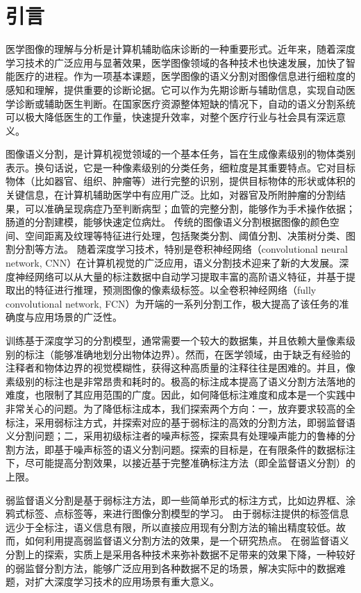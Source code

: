 \chapter{引言}

医学图像的理解与分析是计算机辅助临床诊断的一种重要形式。近年来，随着深度学习技术的广泛应用与显著效果，医学图像领域的各种技术也快速发展，加快了智能医疗的进程。作为一项基本课题，医学图像的语义分割对图像信息进行细粒度的感知和理解，提供重要的诊断论据。它可以作为先期诊断与辅助信息，实现自动医学诊断或辅助医生判断。在国家医疗资源整体短缺的情况下，自动的语义分割系统可以极大降低医生的工作量，快速提升效率，对整个医疗行业与社会具有深远意义。

图像语义分割，是计算机视觉领域的一个基本任务，旨在生成像素级别的物体类别表示。换句话说，它是一种像素级别的分类任务，细粒度是其重要特点。它对目标物体（比如器官、组织、肿瘤等）进行完整的识别，提供目标物体的形状或体积的关键信息，在计算机辅助医学中有应用广泛。比如，对器官及所附肿瘤的分割结果，可以准确呈现病症乃至判断病型；血管的完整分割，能够作为手术操作依据；肠道的分割建模，能够快速定位病灶。
传统的图像语义分割根据图像的颜色空间、空间距离及纹理等特征进行处理，包括聚类分割、阈值分割、决策树分类、图割分割等方法。
随着深度学习技术，特别是卷积神经网络（convolutional neural network, CNN）在计算机视觉的广泛应用，语义分割技术迎来了新的大发展。深度神经网络可以从大量的标注数据中自动学习提取丰富的高阶语义特征，并基于提取出的特征进行推理，预测图像的像素级标签。以全卷积神经网络（fully convolutional network, FCN）为开端的一系列分割工作，极大提高了该任务的准确度与应用场景的广泛性。

训练基于深度学习的分割模型，通常需要一个较大的数据集，并且依赖大量像素级别的标注（能够准确地划分出物体边界）。然而，在医学领域，由于缺乏有经验的注释者和物体边界的视觉模糊性，获得这种高质量的注释往往是困难的。并且，像素级别的标注也是非常昂贵和耗时的。极高的标注成本提高了语义分割方法落地的难度，也限制了其应用范围的广度。因此，如何降低标注难度和成本是一个实践中非常关心的问题。为了降低标注成本，我们探索两个方向：一，放弃要求较高的全标注，采用弱标注方式，并探索对应的基于弱标注的高效的分割方法，即弱监督语义分割问题；二，采用初级标注者的噪声标签，探索具有处理噪声能力的鲁棒的分割方法，即基于噪声标签的语义分割问题。探索的目标是，在有限条件的数据标注下，尽可能提高分割效果，以接近基于完整准确标注方法（即全监督语义分割）的上限。

弱监督语义分割是基于弱标注方法，即一些简单形式的标注方式，比如边界框、涂鸦式标签、点标签等，来进行图像分割模型的学习。
由于弱标注提供的标签信息远少于全标注，语义信息有限，所以直接应用现有分割方法的输出精度较低。故而，如何利用提高弱监督语义分割方法的效果，是一个研究热点。
在弱监督语义分割上的探索，实质上是采用各种技术来弥补数据不足带来的效果下降，一种较好的弱监督分割方法，能够广泛应用到各种数据不足的场景，解决实际中的数据难题，对扩大深度学习技术的应用场景有重大意义。

